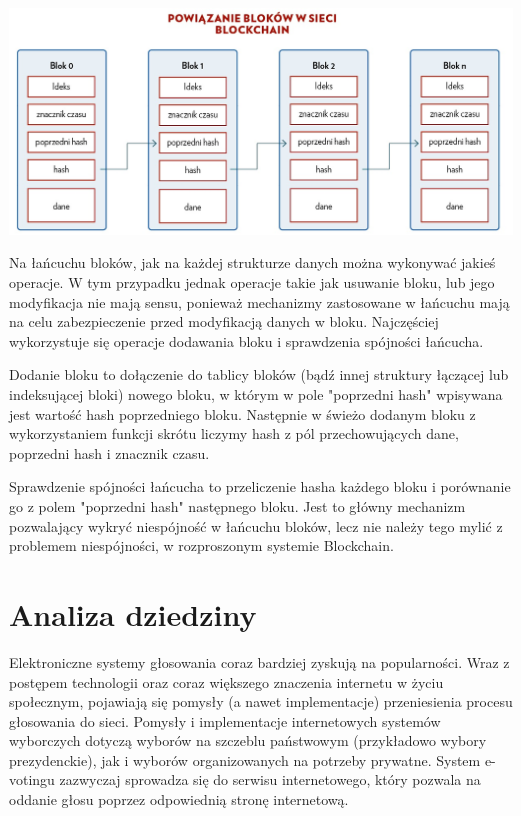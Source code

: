 \documentclass{report}
\begin{document}
\includegraphics[width=\textwidth]{images/łańcuch_bloków.jpg}

Na łańcuchu bloków, jak na każdej strukturze danych można wykonywać jakieś operacje. W tym przypadku jednak operacje takie jak usuwanie bloku, lub jego modyfikacja nie mają sensu, ponieważ mechanizmy zastosowane w łańcuchu mają na celu zabezpieczenie przed modyfikacją danych w bloku. Najczęściej wykorzystuje się operacje dodawania bloku i sprawdzenia spójności łańcucha.

Dodanie bloku to dołączenie do tablicy bloków (bądź innej struktury łączącej lub indeksującej bloki) nowego bloku, w którym w pole "poprzedni hash" wpisywana jest wartość hash poprzedniego bloku. Następnie w świeżo dodanym bloku z wykorzystaniem funkcji skrótu liczymy hash z pól przechowujących dane, poprzedni hash i znacznik czasu.  

Sprawdzenie spójności łańcucha to przeliczenie hasha każdego bloku i porównanie go z polem "poprzedni hash" następnego bloku. Jest to główny mechanizm pozwalający wykryć niespójność w łańcuchu bloków, lecz nie należy tego mylić z problemem niespójności, w rozproszonym systemie Blockchain.


\newpage
\chapter{Analiza dziedziny}
Elektroniczne systemy głosowania coraz bardziej zyskują na popularności.
Wraz z postępem technologii oraz coraz większego znaczenia internetu w życiu 
społecznym, pojawiają się pomysły (a nawet implementacje) przeniesienia procesu głosowania do sieci. Pomysły i implementacje internetowych systemów wyborczych dotyczą wyborów na szczeblu państwowym (przykładowo wybory prezydenckie), jak i wyborów organizowanych na potrzeby prywatne. System e-votingu zazwyczaj sprowadza się do serwisu internetowego, który pozwala na oddanie głosu poprzez odpowiednią stronę internetową. 
\end{document}
